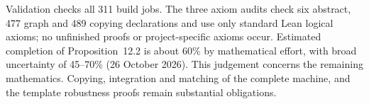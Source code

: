 




Validation checks all 311 build jobs. The three axiom audits check six
abstract, 477 graph and 489 copying declarations and use only standard Lean
logical axioms; no unfinished proofs or project-specific axioms occur.
Estimated completion of Proposition~12.2 is about 60\% by mathematical effort,
with broad uncertainty of 45--70\% (26 October 2026). This judgement concerns
the remaining mathematics. Copying, integration and matching of the complete
machine, and the template robustness proofs remain substantial obligations.

